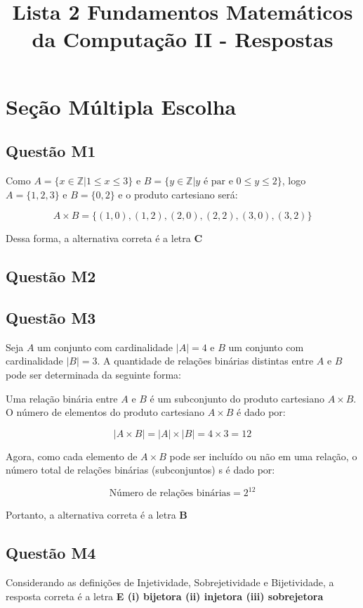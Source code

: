\documentclass{article}
\title{Lista 2 Fundamentos Matemáticos da Computação II - Respostas}
\begin{document}
\maketitle

\section{Seção Múltipla Escolha}

\subsection{Questão M1} 
Como $A = \{x \in \mathbb{Z} | 1 \leq x \leq 3\}$ e $B = \{y \in \mathbb{Z} | y \text{ é par e } 0 \leq y \leq 2\}$, logo $A = \{1,2,3\}$ e $B = \{0,2\}$ e o produto cartesiano será:

\[
    A \times B = \{(1,0),(1,2),(2,0),(2,2),(3,0),(3,2)\}
\]

Dessa forma, a alternativa correta é a letra \textbf{C}


\subsection{Questão M2}
\subsection{Questão M3}
Seja \( A \) um conjunto com cardinalidade \( |A| = 4 \) e \( B \) um conjunto com cardinalidade \( |B| = 3 \). A quantidade de relações binárias distintas entre \( A \) e \( B \) pode ser determinada da seguinte forma:

Uma relação binária entre \( A \) e \( B \) é um subconjunto do produto cartesiano \( A \times B \). O número de elementos do produto cartesiano \( A \times B \) é dado por:

\[
|A \times B| = |A| \times |B| = 4 \times 3 = 12
\]

Agora, como cada elemento de \( A \times B \) pode ser incluído ou não em uma relação, o número total de relações binárias (subconjuntos) s é dado por:

\[
\text{Número de relações binárias} = 2^{12}
\]

Portanto, a alternativa correta é a letra \textbf{B}
\subsection{Questão M4}

Considerando as definições de Injetividade, Sobrejetividade e Bijetividade, a resposta correta é a letra \textbf{E (i) bijetora (ii) injetora (iii) sobrejetora}
\end{document}
